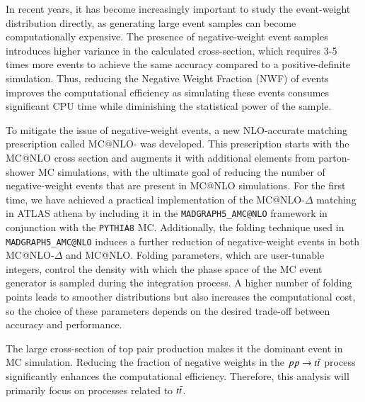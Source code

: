 \documentclass[NOTE, REPORT=true, atlasdraft=true, USenglish]{atlasdoc}
\begin{document}
In recent years, it has become increasingly important to study the event-weight distribution directly, as generating large event samples can become computationally expensive. The presence of negative-weight event samples introduces higher variance in the calculated cross-section, which requires 3-5 times more events to achieve the same accuracy compared to a positive-definite simulation. Thus, reducing the Negative Weight Fraction (NWF) of events improves the computational efficiency as simulating these events consumes significant CPU time while diminishing the statistical power of the sample.



To mitigate the issue of negative-weight events, a new NLO-accurate matching prescription called MC@NLO-\text{$\Delta$}\cite{frederix_reduction_2020} was developed. This prescription starts with the MC@NLO cross section and augments it with additional elements from parton-shower MC simulations, with the ultimate goal of reducing the number of negative-weight events that are present in MC@NLO simulations. For the first time, we have achieved a practical implementation of the MC@NLO-$\Delta$ matching in ATLAS athena by including it in the \texttt{MADGRAPH5\_AMC@NLO} framework in conjunction with the \texttt{PYTHIA8} MC. Additionally, the folding technique used in \texttt{MADGRAPH5\_AMC@NLO} induces a further reduction of negative-weight events in both MC@NLO-$\Delta$ and MC@NLO. Folding parameters, which are user-tunable integers, control the density with which the phase space of the MC event generator is sampled during the integration process. A higher number of folding points leads to smoother distributions but also increases the computational cost, so the choice of these parameters depends on the desired trade-off between accuracy and performance.


The large cross-section of top pair production makes it the dominant event in MC simulation. Reducing the fraction of negative weights in the $pp\rightarrow t\Bar{t}$ process significantly enhances the computational efficiency. Therefore, this analysis will primarily focus on processes related to $t\Bar{t}$.



\end{document}

